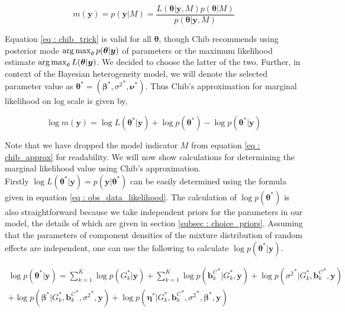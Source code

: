 \begin{equation}
\label{eq : chib_trick}
m(\boldsymbol{y}) = p(\boldsymbol{y}|M) = \dfrac {L(\boldsymbol{\theta}|\boldsymbol{y}, M) p(\boldsymbol{\theta}|M)} {p(\boldsymbol{\theta}|\boldsymbol{y}, M)}
\end{equation}

Equation \ref{eq : chib_trick} is valid for all $\boldsymbol{\theta}$, though Chib recommends using posterior mode $\operatorname*{arg\,max}_\theta p(\boldsymbol{\theta}|\boldsymbol{y})$ of parameters or the maximum likelihood estimate $\operatorname*{arg\,max}_\theta L(\boldsymbol{\theta}|\boldsymbol{y})$. We decided to choose the latter of the two. Further, in context of the Bayesian heterogeneity model, we will denote the selected parameter value as 
$\boldsymbol{\theta}^*=(\boldsymbol{\beta}^*, {\sigma^2}^*, \boldsymbol{\nu}^*)$. Thus Chib's approximation for marginal likelihood on log scale is given by,

\begin{equation}
\label{eq : chib_approx}
\log{\hat{m}(\boldsymbol{y})} = \log{L(\boldsymbol{\theta}^*|\boldsymbol{y})} + \log{p(\boldsymbol{\theta}^*)} - \log{p(\boldsymbol{\theta}^*|\boldsymbol{y})}
\end{equation}

Note that we have dropped the model indicator $M$ from equation \ref{eq : chib_approx} for readability. We will now show calculations for determining the marginal likelihood value using Chib's approximation.\\ 

Firstly $\log{L(\boldsymbol{\theta}^*|\boldsymbol{y})} = p(\boldsymbol{y}|\boldsymbol{\theta}^*)$ can be easily determined using the formula given in equation \ref{eq : obs_data_likelihood}. The calculation of $\log{p(\boldsymbol{\theta}^*)}$ is also straightforward because we take independent priors for the parameters in our model, the details of which are given in section \ref{subsec : choice_priors}. Assuming that the parameters of component densities of the mixture distribution of random effects are independent, one can use the following to calculate $\log{p(\boldsymbol{\theta}^*|\boldsymbol{y})}$.

\begin{multline}
\label{eq : chib_approx_posterior_part}
\log{p(\boldsymbol{\theta}^*|\boldsymbol{y})} = 
\sum_{k=1}^K{\log{p(G_k^*|\boldsymbol{y})}} + 
\sum_{k=1}^K{\log{p({\boldsymbol{b}_k^C}^*|G_k^*, \boldsymbol{y})}} + 
\log{p({\sigma^2}^*|G_k^*, {\boldsymbol{b}_k^C}^*, \boldsymbol{y})}\\
+ \log{p({\boldsymbol{\beta}}^*|G_k^*, {\boldsymbol{b}_k^C}^*, {\sigma^2}^*, \boldsymbol{y})} + 
\log{p({\boldsymbol{\eta}}^*|G_k^*, {\boldsymbol{b}_k^C}^*, {\sigma^2}^*,{\boldsymbol{\beta}}^*, \boldsymbol{y})}
\end{multline}

